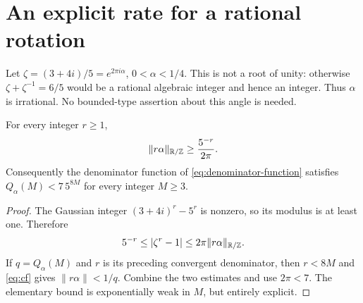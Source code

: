 \section{An explicit rate for a rational rotation}\label{sec:rational}
Let $\zeta=(3+4i)/5=e^{2\pi i\alpha}$, $0<\alpha<1/4$.
This is not a root of unity: otherwise $\zeta+\zeta^{-1}=6/5$ would
be a rational algebraic integer and hence an integer. Thus $\alpha$
is irrational. No bounded-type assertion about this angle is needed.

\begin{lemma}\label{lem:rational-denominator}
For every integer $r\ge1$,
\[
 \|r\alpha\|_{\mathbb R/\mathbb Z}\ge \frac{5^{-r}}{2\pi}.
\]
Consequently the denominator function of \eqref{eq:denominator-function}
satisfies $Q_\alpha(M)<7\,5^{8M}$ for every integer $M\ge3$.
\end{lemma}
\begin{proof}
The Gaussian integer $(3+4i)^r-5^r$ is nonzero, so its modulus is at
least one. Therefore
\[
 5^{-r}\le |\zeta^r-1|
            \le 2\pi\|r\alpha\|_{\mathbb R/\mathbb Z}.
\]
If $q=Q_\alpha(M)$ and $r$ is its preceding convergent denominator,
then $r<8M$ and \eqref{eq:cf} gives
$\|r\alpha\|<1/q$. Combine the two estimates and use $2\pi<7$.
The elementary bound is exponentially weak in $M$, but entirely explicit.
\end{proof}

